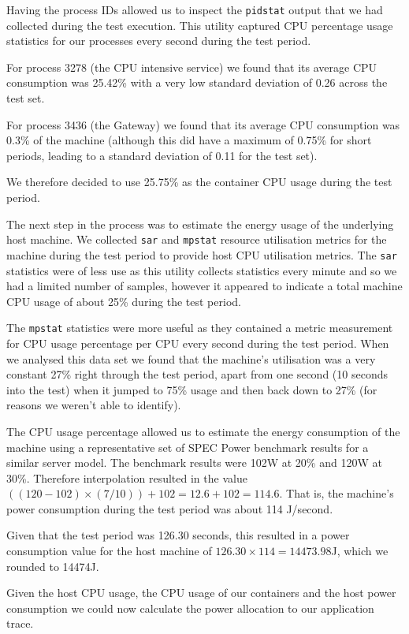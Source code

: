 Having the process IDs allowed us to inspect the \texttt{pidstat} output that we had collected during the test execution.   This utility captured CPU percentage usage statistics for our processes every second during the test period.

For process 3278 (the CPU intensive service) we found that its average CPU consumption was 25.42\% with a very low standard deviation of 0.26 across the test set.

For process 3436 (the Gateway) we found that its average CPU consumption was 0.3\% of the machine (although this did have a maximum of 0.75\% for short periods, leading to a standard deviation of 0.11 for the test set).

We therefore decided to use 25.75\% as the container CPU usage during the test period.

The next step in the process was to estimate the energy usage of the underlying host machine.  We collected \texttt{sar} and \texttt{mpstat} resource utilisation metrics for the machine during the test period to provide host CPU utilisation metrics.  The \texttt{sar} statistics were of less use as this utility collects statistics every minute and so we had a limited number of samples, however it appeared to indicate a total machine CPU usage of about 25\% during the test period.

The \texttt{mpstat} statistics were more useful as they contained a metric measurement for CPU usage percentage per CPU every second during the test period.  When we analysed this data set we found that the machine's utilisation was a very constant 27\% right through the test period, apart from one second (10 seconds into the test) when it jumped to 75\% usage and then back down to 27\% (for reasons we weren't able to identify).

The CPU usage percentage allowed us to estimate the energy consumption of the machine using a representative set of SPEC Power benchmark results for a similar server model.  The benchmark results were 102W at 20\% and 120W at 30\%.  Therefore interpolation resulted in the value $((120 - 102) \times (7/10)) + 102 = 12.6 + 102 = 114.6$.  That is, the machine's power consumption during the test period was about 114 J/second.

Given that the test period was 126.30 seconds, this resulted in a power consumption value for the host machine of $126.30 \times 114 = 14473.98$J, which we rounded to 14474J.

Given the host CPU usage, the CPU usage of our containers and the host power consumption we could now calculate the power allocation to our application trace.

